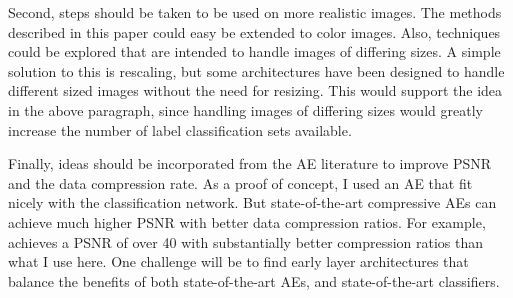 \documentclass[twoside,11pt]{article}
\begin{document}
Second, steps should be taken to be used on more realistic images. The methods described
in this paper could easy be extended to color images. Also, techniques could be explored that
are intended to handle images of differing sizes. A simple solution to this is rescaling,
but some architectures have been designed to handle different sized images
without the need for resizing. %
This would support the idea in the above paragraph, since handling images of differing sizes
would greatly increase the number of label classification sets available.


Finally, ideas should be incorporated from the AE literature to improve PSNR and the 
data compression rate. 
As a proof of concept, I used an AE that fit nicely with the classification network.
But state-of-the-art compressive AEs can achieve much higher PSNR with better data
compression ratios. For example, \citet{theis2017} achieves a PSNR of over 40 with 
substantially better compression ratios than what I use here. 
One challenge will be to find early layer architectures that balance the benefits
of both state-of-the-art
AEs, and state-of-the-art classifiers.  










\end{document}
